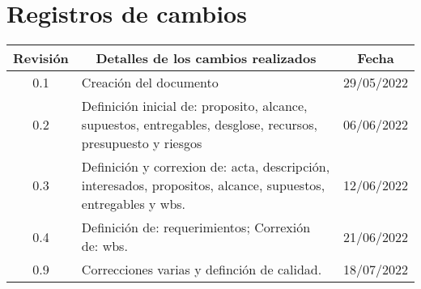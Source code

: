 \section{Registros de cambios}
\label{sec:registro}


\begin{table}[ht]
\label{tab:registro}
\centering
\begin{tabularx}{\linewidth}{@{}|c|X|c|@{}}
\hline
\rowcolor[HTML]{C0C0C0} 
Revisión & \multicolumn{1}{c|}{\cellcolor[HTML]{C0C0C0}Detalles de los cambios realizados} & Fecha      \\ \hline
0.1 & Creación del documento& 29/05/2022\\ \hline
0.2 & Definición inicial de: proposito, alcance, supuestos, entregables, desglose, recursos, presupuesto y riesgos& 06/06/2022\\ \hline
0.3 & Definición y correxion de: acta, descripción, interesados, propositos, alcance, supuestos, entregables y wbs.& 12/06/2022\\ \hline
0.4 & Definición de: requerimientos; Correxión de: wbs.& 21/06/2022\\ \hline
0.9 & Correcciones varias y definción de calidad. & 18/07/2022 \\ \hline
\end{tabularx}
\end{table}

\pagebreak
